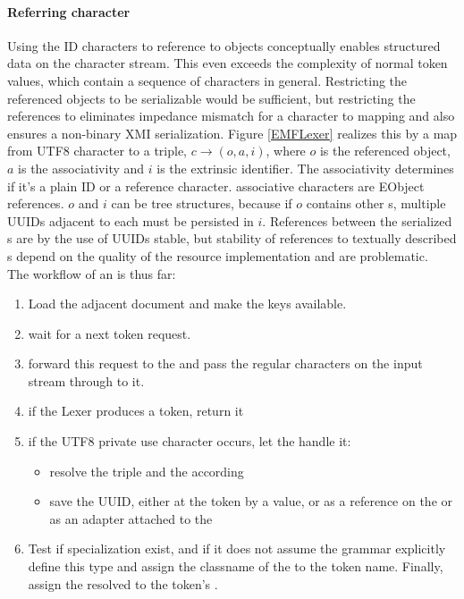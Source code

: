 \paragraph{Referring character} \label{lexer:RefEObj} Using the ID characters to reference to objects conceptually enables structured data on the character stream. This even exceeds the complexity of normal token values, which contain a sequence of characters in general. Restricting the referenced objects to be serializable would be sufficient, but restricting the references to  eliminates impedance mismatch for a character to  mapping and also ensures a non-binary XMI serialization. Figure \ref{EMFLexer} realizes this by a map from UTF8 character to a triple, $c \rightarrow (o,a,i)$, where $o$ is the referenced object, $a$ is the associativity and $i$ is the extrinsic identifier. The associativity determines if it's a plain ID or a reference character.  associative characters are EObject references. $o$ and $i$ can be tree structures, because if $o$ contains other s, multiple UUIDs adjacent to each  must be persisted in $i$. References between the serialized s are by the use of UUIDs stable, but stability of references to textually described s depend on the quality of the resource implementation and are problematic. \\
The workflow of an  is thus far:
\begin{enumerate}
	\item Load the adjacent document and make the keys available.
	\item wait for a next token request.
	\item forward this request to the  and pass the regular characters on the input stream through to it.
	\item if the Lexer produces a token, return it
	\item if the UTF8 private use character occurs, let the  handle it:
		\begin{itemize}
			\item resolve the triple and the according 
			\item save the UUID, either at the token by a value, or as a reference on the  or as an adapter attached to the  
		\end{itemize} 
	\item Test if specialization  exist, and if it does not assume the grammar explicitly define this type and assign the classname of the  to the token name. Finally, assign the resolved  to the token's .
\end{enumerate}

